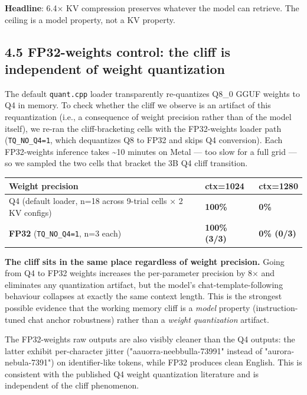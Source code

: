 \documentclass[11pt]{article}
\begin{document}
\textbf{Headline}: 6.4× KV compression preserves whatever the model can retrieve. The ceiling is a model property, not a KV property.


\subsection*{4.5 FP32-weights control: the cliff is independent of weight quantization}


The default \texttt{quant.cpp} loader transparently re-quantizes Q8\_0 GGUF weights to Q4 in memory. To check whether the cliff we observe is an artifact of this requantization (i.e., a consequence of weight precision rather than of the model itself), we re-ran the cliff-bracketing cells with the FP32-weights loader path (\texttt{TQ\_NO\_Q4=1}, which dequantizes Q8 to FP32 and skips Q4 conversion). Each FP32-weights inference takes \textasciitilde{}10 minutes on Metal — too slow for a full grid — so we sampled the two cells that bracket the 3B Q4 cliff transition.


\begin{center}
\begin{tabular}{lll}
\toprule
Weight precision & ctx=1024 & ctx=1280 \\
\midrule
Q4 (default loader, n=18 across 9-trial cells × 2 KV configs) & \textbf{100\%} & \textbf{0\%} \\
\textbf{FP32} (\texttt{TQ\_NO\_Q4=1}, n=3 each) & \textbf{100\% (3/3)} & \textbf{0\% (0/3)} \\
\bottomrule
\end{tabular}
\end{center}


\textbf{The cliff sits in the same place regardless of weight precision.} Going from Q4 to FP32 weights increases the per-parameter precision by 8× and eliminates any quantization artifact, but the model's chat-template-following behaviour collapses at exactly the same context length. This is the strongest possible evidence that the working memory cliff is a \textit{model} property (instruction-tuned chat anchor robustness) rather than a \textit{weight quantization} artifact.


The FP32-weights raw outputs are also visibly cleaner than the Q4 outputs: the latter exhibit per-character jitter ("aauorra-neebbulla-73991" instead of "aurora-nebula-7391") on identifier-like tokens, while FP32 produces clean English. This is consistent with the published Q4 weight quantization literature and is independent of the cliff phenomenon.
\end{document}
